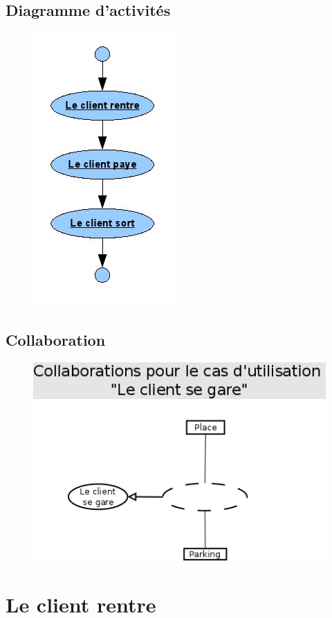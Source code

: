 \documentclass[a4paper]{article}
\begin{document}
\subsection{Diagramme d'activit\'es}
\begin{figure}[!ht]
\centering
\includegraphics[scale=.7]{imgs/act_segare.jpg}
\end{figure}

\subsection{Collaboration}
\begin{figure}[!ht]
\centering
\includegraphics[scale=.5]{collaborations/_gare.png}
\end{figure}

\newpage

\section{Le client rentre}
\end{document}
